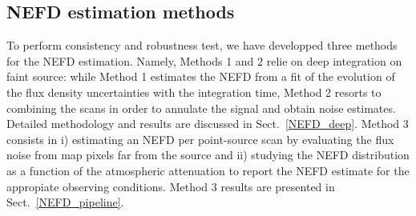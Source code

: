 \subsection{NEFD estimation methods}

To perform consistency and robustness test, we have developped three methods for the NEFD estimation. Namely, Methods 1 and 2 relie on deep integration on faint source: while Method 1 estimates the NEFD from a fit of the evolution of the flux density uncertainties with the integration time, Method 2 resorts to combining the scans in order to annulate the signal and obtain noise estimates. Detailed methodology and results are discussed in Sect.~\ref{NEFD_deep}. Method 3 consists in i) estimating an NEFD per point-source scan by evaluating the flux noise from map pixels far from the source and ii) studying the NEFD distribution as a function of the atmospheric attenuation to report the NEFD estimate for the appropiate observing conditions. Method 3 results are presented in Sect.~\ref{NEFD_pipeline}.     


